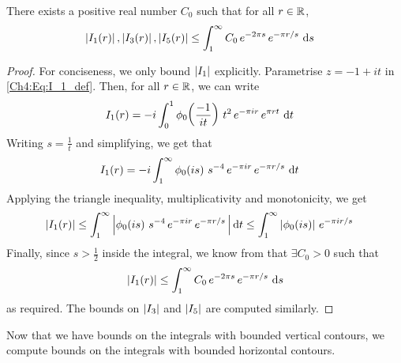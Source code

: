 \begin{boxlemma}\label{Ch4:Lemma:Bound_I1_I3_I5}
    There exists a positive real number $C_0$ such that for all $r \in \mathbb{R}$,
    \begin{align*}
        \left\lvert I_1(r) \right\rvert, \left\lvert I_3(r) \right\rvert, \left\lvert I_5(r) \right\rvert &\leq \int_{1}^{\infty} C_0 \, e^{-2\pi s} \, e^{-\pi r/s} \, \operatorname{d}\!{s}
    \end{align*}
\end{boxlemma}
\begin{proof}
    For conciseness, we only bound $\left\lvert I_1 \right\rvert$ explicitly. Parametrise $z = -1 + it$ in \eqref{Ch4:Eq:I_1_def}. Then, for all $r \in \mathbb{R}$, we can write
    \begin{align*}
        I_1(r) &= -i \int_{0}^{1}
            \phi_0\!\left( \frac{-1}{it} \right) \,
            t^2 \,
            e^{-\pi i r} \,
            e^{\pi r t}\,
            \operatorname{d}\!{t}
    \end{align*}
    Writing $s = \frac{1}{t}$ and simplifying, we get that
    \begin{align*}
        I_1(r) &= -i \int_{1}^{\infty}
            \phi_0\!\left( is \right) \,
            s^{-4} \,
            e^{-\pi i r} \,
            e^{-\pi r / s}\,
            \operatorname{d}\!{t}
    \end{align*}
    Applying the triangle inequality, multiplicativity and monotonicity, we get
    \begin{align*}
        \left\lvert I_1(r) \right\rvert &\leq \int_{1}^{\infty} \left\lvert 
            \phi_0\!\left( is \right) \,
            s^{-4} \,
            e^{-\pi i r} \,
            e^{-\pi r / s}\,
             \right\rvert \operatorname{d}\!{t}
        \leq \int_{1}^{\infty}
            \left\lvert \phi_0\!\left( is \right) \right\rvert \,
            e^{-\pi i r/s}
    \end{align*}
    Finally, since $s > \frac{1}{2}$ inside the integral, we know from  that $\exists C_0 > 0$ such that
    \begin{align*}
        \left\lvert I_1(r) \right\rvert \leq \int_{1}^{\infty} C_0 \, e^{-2\pi s} \, e^{-\pi r/s} \, \operatorname{d}\!{s}
    \end{align*}
    as required. The bounds on $\left\lvert I_3 \right\rvert$ and $\left\lvert I_5 \right\rvert$ are computed similarly.
\end{proof}

Now that we have bounds on the integrals with bounded vertical contours, we compute bounds on the integrals with bounded horizontal contours.

